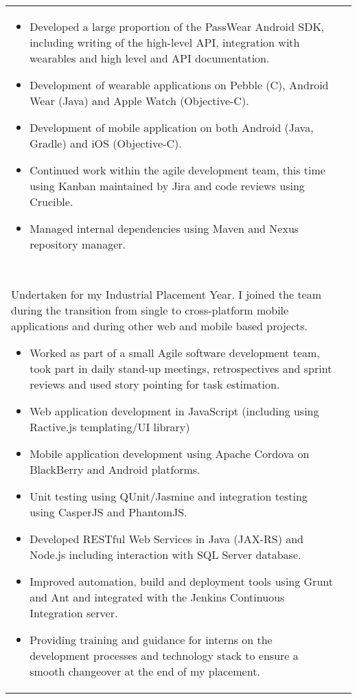 \documentclass[7pt]{article}
\def\middot{\textperiodcentered~}
\begin{document}
\begin{longtable}{@{} p{} p{}}
\begin{minipage} [t] {0.85\textwidth}
    \begin{itemize}
      \setlength\itemsep{-1pt}
      \item Developed a large proportion of the PassWear Android SDK, including writing of the high-level API, integration with wearables and high level and API documentation.
      \item Development of wearable applications on Pebble (C), Android Wear (Java) and Apple Watch (Objective-C).
      \item Development of mobile application on both Android (Java, Gradle) and iOS (Objective-C).
      \item Continued work within the agile development team, this time using Kanban maintained by Jira and code reviews using Crucible.
      \item Managed internal dependencies using Maven and Nexus repository manager.
    \end{itemize}
  \end{minipage} \\
  & \\
  & \begin{minipage} [t] {0.85\textwidth}
    August 2013 - August 2014 \textbf{Mobbu}, Brighton \middot Intern Developer \\
    \newline
    Undertaken for my Industrial Placement Year. I joined the team during the transition from single to cross-platform mobile applications and during other web and mobile based projects.
    \begin{itemize}
      \setlength\itemsep{-1pt}
      \item Worked as part of a small Agile software development team, took part in daily stand-up meetings, retrospectives and sprint reviews and used story pointing for task estimation.
      \item Web application development in JavaScript (including using Ractive.js templating/UI library)
      \item Mobile application development using Apache Cordova on BlackBerry and Android platforms.
      \item Unit testing using QUnit/Jasmine and integration testing using CasperJS and PhantomJS.
      \item Developed RESTful Web Services in Java (JAX-RS) and Node.js including interaction with SQL Server database.
      \item Improved automation, build and deployment tools using Grunt and Ant and integrated with the Jenkins Continuous Integration server.
      \item Providing training and guidance for interns on the development processes and technology stack to ensure a smooth changeover at the end of my placement.
    \end{itemize}
  \end{minipage}
\end{longtable}
\end{document}
